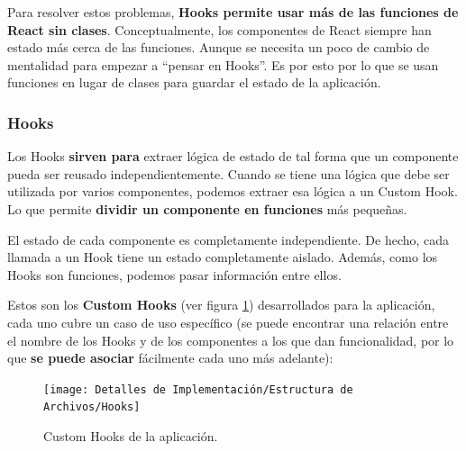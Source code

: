 \documentclass[12pt,twoside,titlepage]{report}
\begin{document}
Para resolver estos problemas, \textbf{Hooks permite usar más de las funciones de React sin clases}. Conceptualmente, los componentes de React siempre han estado más cerca de las funciones. Aunque se necesita un poco de cambio de mentalidad para empezar a “pensar en Hooks”. Es por esto por lo que se usan funciones en lugar de clases para guardar el estado de la aplicación.

\subsubsection{Hooks}

Los Hooks \textbf{sirven para} extraer lógica de estado de tal forma que un componente pueda ser reusado independientemente. Cuando se tiene una lógica que debe ser utilizada por varios componentes, podemos extraer esa lógica a un Custom Hook. Lo que permite \textbf{dividir un componente en funciones} más pequeñas.

El estado de cada componente es completamente independiente. De hecho, cada llamada a un Hook tiene un estado completamente aislado. Además, como los Hooks son funciones, podemos pasar información entre ellos.

Estos son los \textbf{Custom Hooks} (ver figura \ref{fig:Hooks}) desarrollados para la aplicación, cada uno cubre un caso de uso específico (se puede encontrar una relación entre el nombre de los Hooks y de los componentes a los que dan funcionalidad, por lo que \textbf{se puede asociar} fácilmente cada uno más adelante):

\begin{figure}[H]
    \centering
    \texttt{[image: Detalles de Implementación/Estructura de Archivos/Hooks]}
    \caption{Custom Hooks de la aplicación.}
    \label{fig:Hooks}
\end{figure}
\end{document}
